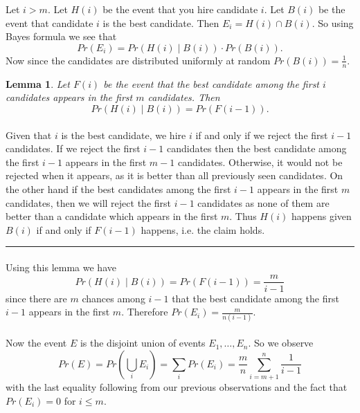 \documentclass[letterpaper,12pt,oneside,onecolumn]{article}
\newenvironment{proof}{{\bf Proof:  }}{\hfill\rule{2mm}{2mm}}
\newtheorem{lemma}[fact]{Lemma}
\begin{document}
\newpage
\section{}
\paragraph{}
Let $i > m$. Let $H(i)$ be the event that you hire candidate $i$. Let $B(i)$ be the event that candidate $i$ is the best candidate. Then $E_i = H(i) \cap B(i)$. So using Bayes formula we see that
$$Pr(E_i) = Pr(H(i) \mid B(i)) \cdot Pr(B(i)).$$
Now since the candidates are distributed uniformly at random $Pr(B(i)) = \frac{1}{n}$.
\begin{lemma}
Let $F(i)$ be the event that the best candidate among the first $i$ candidates appears in the first $m$ candidates. Then
$$Pr(H(i) \mid B(i)) = Pr(F(i-1)).$$
\end{lemma}
\begin{proof}
\paragraph{}
Given that $i$ is the best candidate, we hire $i$ if and only if we reject the first $i-1$ candidates. If we reject the first $i-1$ candidates then the best candidate among the first $i-1$ appears in the first $m-1$ candidates. Otherwise, it would not be rejected when it appears, as it is better than all previously seen candidates. On the other hand if the best candidates among the first $i-1$ appears in the first $m$ candidates, then we will reject the first $i-1$ candidates as none of them are better than a candidate which appears in the first $m$. Thus $H(i)$ happens given $B(i)$ if and only if $F(i-1)$ happens, i.e. the claim holds.
\end{proof}
\paragraph{}
Using this lemma we have
$$Pr(H(i) \mid B(i)) = Pr(F(i-1)) = \frac{m}{i-1}$$
since there are $m$ chances among $i-1$ that the best candidate among the first $i-1$ appears in the first $m$.
Therefore $Pr(E_i) = \frac{m}{n(i-1)}$.
\paragraph{}
Now the event $E$ is the disjoint union of events $E_1, \dots, E_n$. So we observe 
$$Pr(E) = Pr(\bigcup_{i} E_i) = \sum_{i} Pr(E_i) = \frac{m}{n}\sum_{i=m+1}^n \frac{1}{i-1}$$
with the last equality following from our previous observations and the fact that $Pr(E_i) = 0$ for $i \leq m$.
\end{document}
